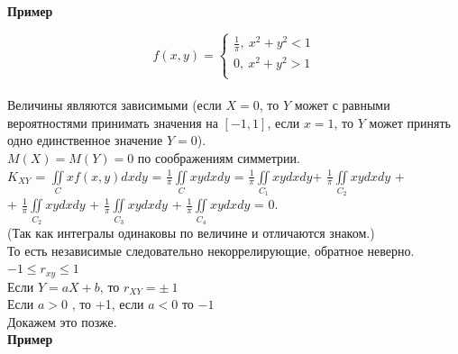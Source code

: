 \documentclass[russian, 12pt, fleqn]{article}
\begin{document}
\textbf{Пример}\\
\begin{equation*} 
f(x, y)=
 \begin{cases}
   \frac{1}{\pi},\    x^2 + y^2 < 1\\
   0 ,\  x^2 + y^2 > 1\\
 \end{cases}
\end{equation*}\\
Величины являются зависимыми (если $X  = 0$, то $Y$ может с равными вероятностями принимать значения на $[-1, 1]$, если $x=1$, то $Y$ может принять одно единственное значение $Y=0$).\\
$M(X)=M(Y) = 0$ по соображениям симметрии.\\
$K_{XY}$ = $\displaystyle{\iint\limits_{C}^{}} xf(x, y)dxdy$ =  $\frac{1}{\pi} \displaystyle{\iint\limits_{C}^{}} xy dxdy$ = $\frac{1}{\pi} \displaystyle{\iint\limits_{C_1}^{}} xy dxdy$+ $\frac{1}{\pi} \displaystyle{\iint\limits_{C_2}^{}} xy dxdy$ +\\+ $\frac{1}{\pi} \displaystyle{\iint\limits_{C_2}^{}} xy dxdy$ + $\frac{1}{\pi} \displaystyle{\iint\limits_{C_3}^{}} xy dxdy$ + $\frac{1}{\pi} \displaystyle{\iint\limits_{C_4}^{}} xy dxdy$ = $0$.\\
(Так как интегралы одинаковы по величине и отличаются знаком.)\\	
То есть независимые следовательно некоррелирующие, обратное неверно.\\
$-1\leq r_{xy} \leq 1$\\
Если $Y=aX+b$, то $r_{XY} = \pm \ 1$\\
Если $a>0$   , то +1, если $a<0$ то $-1$\\
Докажем это позже.\\
\textbf{Пример}\\
\end{document}
